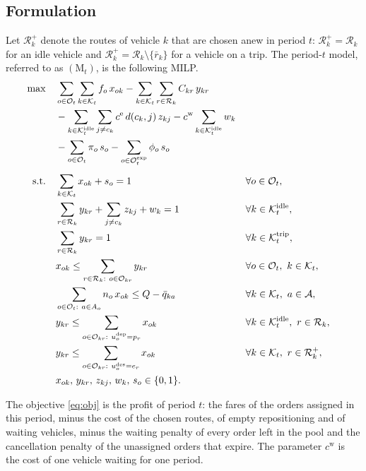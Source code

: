 \documentclass[12pt]{article}
\theoremstyle{plain}
\theoremstyle{definition}
\newcommand{\dep}{u^{\mathrm{dep}}}
\newcommand{\des}{u^{\mathrm{des}}}
\newcommand{\Kidle}{\mathcal{K}^{\mathrm{idle}}_t}
\newcommand{\Ktrip}{\mathcal{K}^{\mathrm{trip}}_t}
\newcommand{\Kdec}{\mathcal{K}_t}
\newcommand{\Oexp}{\mathcal{O}^{\mathrm{exp}}_t}
\begin{document}
\subsection{Formulation}

Let $\mathcal{R}^{+}_k$ denote the routes of vehicle $k$ that are chosen anew in period $t$: $\mathcal{R}^{+}_k=\mathcal{R}_k$ for an idle vehicle and $\mathcal{R}^{+}_k=\mathcal{R}_k\setminus\{\bar r_k\}$ for a vehicle on a trip. The period-$t$ model, referred to as $(\mathrm{M}_t)$, is the following MILP.
\begin{align}
\max\quad
& \sum_{o\in\mathcal{O}_t}\sum_{k\in\Kdec} f_o\,x_{ok}
 -\sum_{k\in\Kdec}\sum_{r\in\mathcal{R}_k} C_{kr}\,y_{kr} \notag\\
& -\sum_{k\in\Kidle}\sum_{j\neq c_k} c^{\mathrm{e}}\,d(c_k,j)\,z_{kj}
 -c^{\mathrm{w}}\sum_{k\in\Kidle} w_k \notag\\
& -\sum_{o\in\mathcal{O}_t}\pi_o\,s_o
 -\sum_{o\in\Oexp}\phi_o\,s_o \label{eq:obj}\\[4pt]
\text{s.t.}\quad
& \sum_{k\in\Kdec} x_{ok}+s_o=1 && \forall o\in\mathcal{O}_t, \label{eq:assign}\\
& \sum_{r\in\mathcal{R}_k} y_{kr}+\sum_{j\neq c_k} z_{kj}+w_k=1 && \forall k\in\Kidle, \label{eq:oneidle}\\
& \sum_{r\in\mathcal{R}_k} y_{kr}=1 && \forall k\in\Ktrip, \label{eq:onetrip}\\
& x_{ok}\le\sum_{r\in\mathcal{R}_k:\ o\in\mathcal{O}_{kr}} y_{kr} && \forall o\in\mathcal{O}_t,\ k\in\Kdec, \label{eq:cover}\\
& \sum_{o\in\mathcal{O}_t:\ a\in A_o} n_o\,x_{ok}\le Q-\bar q_{ka} && \forall k\in\Kdec,\ a\in\mathcal{A}, \label{eq:seats}\\
& y_{kr}\le\sum_{o\in\mathcal{O}_{kr}:\ \dep_o=p_r} x_{ok} && \forall k\in\Kidle,\ r\in\mathcal{R}_k, \label{eq:anchor-start}\\
& y_{kr}\le\sum_{o\in\mathcal{O}_{kr}:\ \des_o=e_r} x_{ok} && \forall k\in\Kdec,\ r\in\mathcal{R}^{+}_k, \label{eq:anchor-end}\\
& x_{ok},\,y_{kr},\,z_{kj},\,w_k,\,s_o\in\{0,1\}. \label{eq:binary}
\end{align}

The objective \eqref{eq:obj} is the profit of period $t$: the fares of the orders assigned in this period, minus the cost of the chosen routes, of empty repositioning and of waiting vehicles, minus the waiting penalty of every order left in the pool and the cancellation penalty of the unassigned orders that expire. The parameter $c^{\mathrm{w}}$ is the cost of one vehicle waiting for one period.
\end{document}
